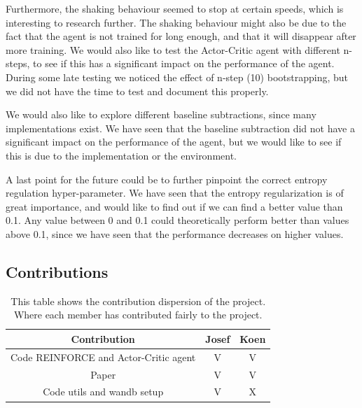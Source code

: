 \documentclass{article}
\begin{document}
Furthermore, the shaking behaviour seemed to stop at certain speeds, which is interesting to research further.
The shaking behaviour might also be due to the fact that the agent is not trained for long enough, and that it will disappear after more training.
We would also like to test the Actor-Critic agent with different n-steps, to see if this has a significant impact on the performance of the agent.
During some late testing we noticed the effect of n-step (10) bootstrapping, but we did not have the time to test and document this properly.

We would also like to explore different baseline subtractions, since many implementations exist.
We have seen that the baseline subtraction did not have a significant impact on the performance of the agent, but we would like to see if this is due to the implementation or the environment.


A last point for the future could be to further pinpoint the correct entropy regulation hyper-parameter.
We have seen that the entropy regularization is of great importance, and would like to find out  if we can find a better value than 0.1.
Any value between 0 and 0.1 could theoretically perform better than values above 0.1, since we have seen that the performance decreases on higher values.


\subsection{Contributions}
\label{C-Contributes}

\begin{table}[H]
    \centering
    \begin{tabular}{|c|c|c|}
        \hline
        \textbf{Contribution} & \textbf{Josef} & \textbf{Koen} \\
        \hline
    Code REINFORCE and Actor-Critic agent & V              & V             \\
    Paper                                 & V              & V             \\
    Code utils and wandb setup            & V              & X       \\
    \hline     
    \end{tabular}
    \caption{This table shows the contribution dispersion of the project. Where each member has contributed fairly to the project.  }
    \label{tab:Contribution}
    \end{table}



\end{document}
